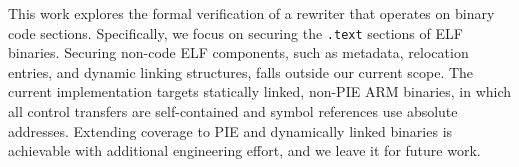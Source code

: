 This work explores the formal verification of a rewriter that operates on binary code sections. Specifically, we focus on securing the \texttt{.text} sections of ELF binaries. Securing non-code ELF components, such as metadata, relocation entries, and dynamic linking structures, falls outside our current scope.
%
The current implementation targets statically linked, non-PIE ARM binaries, in which all control transfers are self-contained and symbol references use absolute addresses. Extending coverage to PIE and dynamically linked binaries is achievable with additional engineering effort, and we leave it for future work.
